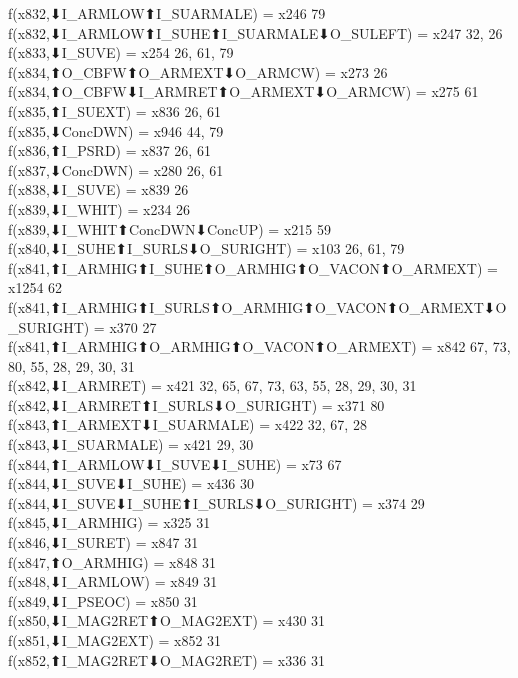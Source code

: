 f(x832,⬇I_ARMLOW⬆I_SUARMALE) = x246 {79} \\
f(x832,⬇I_ARMLOW⬆I_SUHE⬆I_SUARMALE⬇O_SULEFT) = x247 {32, 26} \\
f(x833,⬇I_SUVE) = x254 {26, 61, 79} \\
f(x834,⬆O_CBFW⬆O_ARMEXT⬇O_ARMCW) = x273 {26} \\
f(x834,⬆O_CBFW⬇I_ARMRET⬆O_ARMEXT⬇O_ARMCW) = x275 {61} \\
f(x835,⬆I_SUEXT) = x836 {26, 61} \\
f(x835,⬇ConcDWN) = x946 {44, 79} \\
f(x836,⬆I_PSRD) = x837 {26, 61} \\
f(x837,⬇ConcDWN) = x280 {26, 61} \\
f(x838,⬇I_SUVE) = x839 {26} \\
f(x839,⬇I_WHIT) = x234 {26} \\
f(x839,⬇I_WHIT⬆ConcDWN⬇ConcUP) = x215 {59} \\
f(x840,⬇I_SUHE⬆I_SURLS⬇O_SURIGHT) = x103 {26, 61, 79} \\
f(x841,⬆I_ARMHIG⬆I_SUHE⬆O_ARMHIG⬆O_VACON⬆O_ARMEXT) = x1254 {62} \\
f(x841,⬆I_ARMHIG⬆I_SURLS⬆O_ARMHIG⬆O_VACON⬆O_ARMEXT⬇O_SURIGHT) = x370 {27} \\
f(x841,⬆I_ARMHIG⬆O_ARMHIG⬆O_VACON⬆O_ARMEXT) = x842 {67, 73, 80, 55, 28, 29, 30, 31} \\
f(x842,⬇I_ARMRET) = x421 {32, 65, 67, 73, 63, 55, 28, 29, 30, 31} \\
f(x842,⬇I_ARMRET⬆I_SURLS⬇O_SURIGHT) = x371 {80} \\
f(x843,⬆I_ARMEXT⬇I_SUARMALE) = x422 {32, 67, 28} \\
f(x843,⬇I_SUARMALE) = x421 {29, 30} \\
f(x844,⬆I_ARMLOW⬇I_SUVE⬇I_SUHE) = x73 {67} \\
f(x844,⬇I_SUVE⬇I_SUHE) = x436 {30} \\
f(x844,⬇I_SUVE⬇I_SUHE⬆I_SURLS⬇O_SURIGHT) = x374 {29} \\
f(x845,⬇I_ARMHIG) = x325 {31} \\
f(x846,⬇I_SURET) = x847 {31} \\
f(x847,⬆O_ARMHIG) = x848 {31} \\
f(x848,⬇I_ARMLOW) = x849 {31} \\
f(x849,⬇I_PSEOC) = x850 {31} \\
f(x850,⬇I_MAG2RET⬆O_MAG2EXT) = x430 {31} \\
f(x851,⬇I_MAG2EXT) = x852 {31} \\
f(x852,⬆I_MAG2RET⬇O_MAG2RET) = x336 {31} \\

